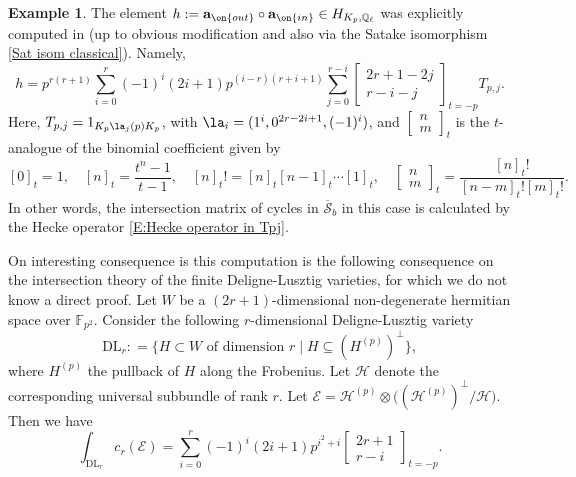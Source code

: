 \documentclass[11pt]{amsart}
\theoremstyle{definition}
\theoremstyle{definition}
\newtheorem{ex}[thm]{Example}
\theoremstyle{definition}
\numberwithin{equation}{section}
\newcommand{\bF}{{\mathbb F}}
\newcommand{\bQ}{{\mathbb Q}}
\newcommand{\mE}{{\mathcal E}}
\newcommand{\mH}{{\mathcal H}}
\newcommand{\scrS}{{\mathscr S}}
\begin{document}
\begin{ex}
The element $h:=\mathbf a_{\on{out}}\circ\mathbf a_{\on{in}} \in H_{K_p,\bQ_\ell}$ was explicitly computed in \cite[Example 6.4.2]{Xiao-Zhu-Invariants} (up to obvious modification and also via the Satake isomorphism \eqref{Sat isom classical}). Namely,
\begin{equation}
\label{E:Hecke operator in Tpj}
h=p^{r(r+1)}\sum_{i=0}^{r} (-1)^i(2i+1)p^{(i-r)(r+i+1)}\sum_{j=0}^{r-i} \begin{bmatrix} 2r+1-2j \\ r-i- j\end{bmatrix}_{t=-p}T_{p,j}.
\end{equation}
Here, $T_{p,j}=1_{K_p\la_j(p)K_p}$, with $\la_i=(1^i,0^{2r-2i+1},(-1)^i)$, and $\begin{bmatrix} n \\ m\end{bmatrix}_t$ is the
 $t$-analogue of the binomial coefficient given by
\[
[0]_t=1,\quad [n]_t=\frac{t^n-1}{t-1},\quad [n]_t!=[n]_t[n-1]_t\cdots[1]_t,\quad \begin{bmatrix} n \\ m\end{bmatrix}_t=\frac{[n]_t!}{[n-m]_t![m]_t!}.
\]
In other words, the intersection matrix of cycles in $\overline\scrS_b$ in this case is calculated by the Hecke operator \eqref{E:Hecke operator in Tpj}. 

On interesting consequence is this computation is the following consequence on the intersection theory of the finite Deligne-Lusztig varieties, for which we do not know a direct proof.
Let $W$ be a $(2r+1)$-dimensional non-degenerate hermitian space over $\bF_{p^2}$.
Consider the following $r$-dimensional Deligne-Lusztig variety
\[
\mathrm{DL}_{r}: = \big\{ H \subset W \textrm{ of dimension }r\; |\; H \subseteq (H^{(p)})^\perp \big\},
\]
where $H^{(p)}$ the pullback of $H$ along the Frobenius.
Let $\mH$ denote the corresponding universal subbundle of rank $r$. Let $\mE = \mH^{(p)} \otimes \big( (\mH^{(p)})^\perp / \mH \big)$. Then we have
\begin{equation}\label{E: chern class on DL}
\int_{\mathrm{DL}_r} c_r( \mE)  = \sum_{i = 0}^r (-1)^i(2i+1) p^{i^2+i} \begin{bmatrix} 2r+1 \\ r-i\end{bmatrix}_{t=-p}.
\end{equation}
\end{ex}
\end{document}
